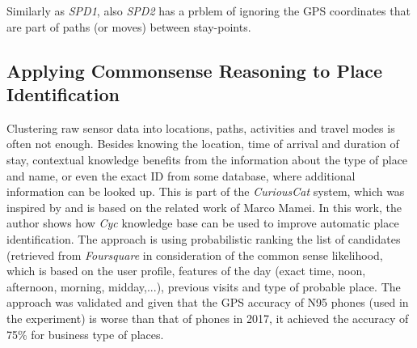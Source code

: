 Similarly as \emph{SPD1}, also \emph{SPD2} has a prblem of ignoring the GPS 
coordinates that are part of paths (or moves) between stay-points.

\subsection{Applying Commonsense Reasoning to Place Identification}
\label{section:MarcoMamei}
Clustering raw sensor data into locations, paths, activities and travel modes
is often not enough. Besides knowing the location, time of arrival and duration
of stay, contextual knowledge benefits from the information about the type of
place and name, or even the exact ID from some database, where additional 
information can be looked up. This is part of the \emph{CuriousCat} system, 
which was inspired by and is based on the related work of Marco 
Mamei\parencite{Mamei2010}.
In this work, the author shows how \emph{Cyc} knowledge base can be used to
improve automatic place identification. The approach is using probabilistic
ranking the list of candidates (retrieved from \emph{Foursquare} in consideration
of the common sense likelihood, which is based on the user profile, features of
the day (exact time, noon, afternoon, morning, midday,...), previous visits
and type of probable place. The approach was validated and given that the
GPS accuracy of N95 phones (used in the experiment) is worse than that of phones
in 2017, it achieved the accuracy of 75\% for business type of places.
